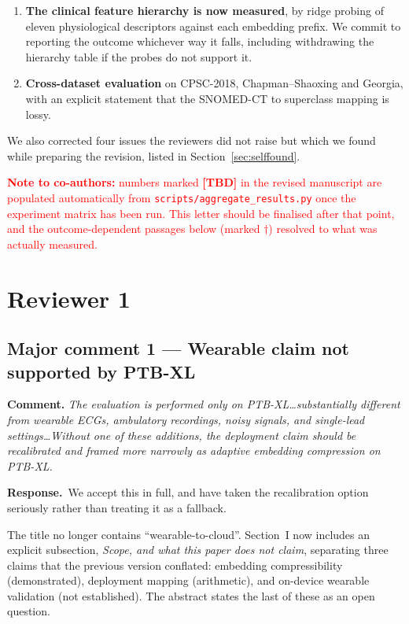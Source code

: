 \documentclass[11pt,a4paper]{article}
\newcommand{\comment}[1]{\par\medskip\noindent\textcolor{revblue}{\textbf{Comment.} \textit{#1}}\par\smallskip}
\newcommand{\response}{\par\noindent\textbf{Response.}\ }
\newcommand{\TBD}{\textcolor{red}{\textbf{[TBD]}}}
\begin{document}
\begin{enumerate}[leftmargin=*,itemsep=3pt]
\item \textbf{The clinical feature hierarchy is now measured}, by ridge
probing of eleven physiological descriptors against each embedding prefix. We
commit to reporting the outcome whichever way it falls, including withdrawing
the hierarchy table if the probes do not support it.

\item \textbf{Cross-dataset evaluation} on CPSC-2018, Chapman--Shaoxing and
Georgia, with an explicit statement that the SNOMED-CT to superclass mapping
is lossy.
\end{enumerate}

We also corrected four issues the reviewers did not raise but which we found
while preparing the revision, listed in Section~\ref{sec:selffound}.

\medskip
\noindent\textcolor{red}{\textbf{Note to co-authors:} numbers marked \TBD{} in
the revised manuscript are populated automatically from
\texttt{scripts/aggregate\_results.py} once the experiment matrix has been
run. This letter should be finalised after that point, and the outcome-dependent
passages below (marked $\dagger$) resolved to what was actually measured.}

\section{Reviewer 1}

\subsection*{Major comment 1 --- Wearable claim not supported by PTB-XL}

\comment{The evaluation is performed only on PTB-XL\ldots substantially
different from wearable ECGs, ambulatory recordings, noisy signals, and
single-lead settings\ldots Without one of these additions, the deployment
claim should be recalibrated and framed more narrowly as adaptive embedding
compression on PTB-XL.}

\response We accept this in full, and have taken the recalibration option
seriously rather than treating it as a fallback.

The title no longer contains ``wearable-to-cloud''. Section~I now includes an
explicit subsection, \textit{Scope, and what this paper does not claim},
separating three claims that the previous version conflated: embedding
compressibility (demonstrated), deployment mapping (arithmetic), and on-device
wearable validation (not established). The abstract states the last of these
as an open question.
\end{document}
